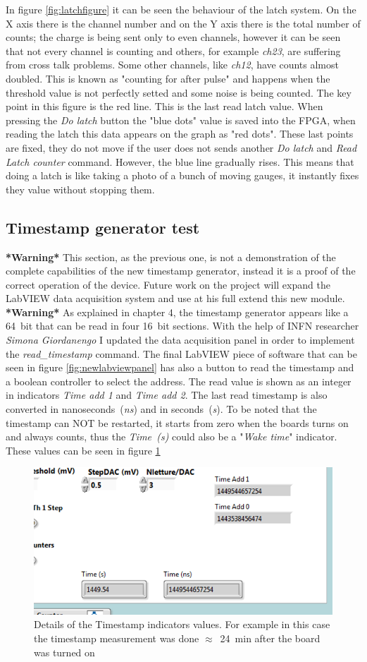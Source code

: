 \noindent In figure \ref{fig:latchfigure} it can be seen the behaviour of the latch system. On the X axis there is the channel number and on the Y axis there is the total number of counts; the charge is being sent only to even channels, however it can be seen that not every channel is counting and others, for example \textit{ch23}, are suffering from cross talk problems. Some other channels, like \textit{ch12}, have counts almost doubled. This is known as "counting for after pulse" and happens when the threshold value is not perfectly setted and some noise is being counted.
The key point in this figure is the red line. This is the last read latch value.
When pressing the \textit{Do latch} button the "blue dots" value is saved into the FPGA, when reading the latch this data appears on the graph as "red dots".
These last points are fixed, they do not move if the user does not sends another \textit{Do latch} and \textit{Read Latch counter} command. However, the blue line gradually rises.
This means that doing a latch is like taking a photo of a bunch of moving gauges, it instantly fixes they value without stopping them.  
\subsection{Timestamp generator test}
\noindent \textbf{*Warning*} This section, as the previous one, is not a demonstration of the complete capabilities of the new timestamp generator, instead it is a proof of the correct operation of the device. Future work on the project will expand the LabVIEW data acquisition system and use at his full extend this new module. \textbf{*Warning*}
\newline
As explained in chapter 4, the timestamp generator appears like a 64~bit that can be read in four 16~bit sections.
With the help of INFN researcher \textit{Simona Giordanengo} I updated the data acquisition panel in order to implement the \textit{read\_timestamp} command.
The final LabVIEW piece of software that can be seen in figure \ref{fig:newlabviewpanel} has also a button to read the timestamp and a boolean controller to select the address.
The read value is shown as an integer in indicators \textit{Time add 1} and \textit{Time add 2}. The last read timestamp is also converted in nanoseconds~(\textit{ns}) and in seconds~(\textit{s}).
To be noted that the timestamp can NOT be restarted, it starts from zero when the boards turns on and always counts, thus the \textit{Time~(s)} could also be a "\textit{Wake time}" indicator.
These values can be seen in figure \ref{fig:timestampfigure}
\begin{figure}[H]
	\centering
	\includegraphics[width=0.5\linewidth]{IMG/ch5/latch_tests/fig15.PNG}
	\caption{Details of the Timestamp indicators values. For example in this case the timestamp measurement was done $\approx$~24~min after the board was turned on}
	\label{fig:timestampfigure}
\end{figure}
